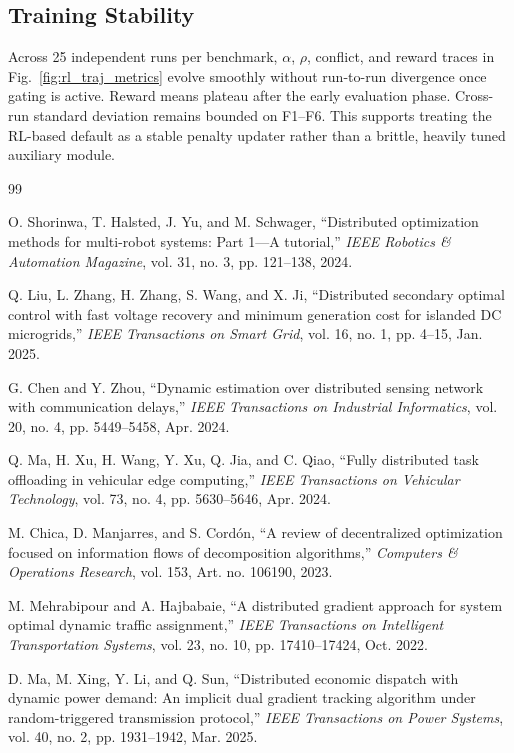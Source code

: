 \documentclass[conference]{IEEEtran}
\begin{document}
\subsection{Training Stability}\label{app:rl_stability}
Across 25 independent runs per benchmark, $\alpha$, $\rho$, conflict, and reward traces in Fig.~\ref{fig:rl_traj_metrics} evolve smoothly without run-to-run divergence once gating is active. Reward means plateau after the early evaluation phase. Cross-run standard deviation remains bounded on F1--F6. This supports treating the RL-based default as a stable penalty updater rather than a brittle, heavily tuned auxiliary module.

\begin{thebibliography}{99}

 O. Shorinwa, T. Halsted, J. Yu, and M. Schwager, ``Distributed optimization methods for multi-robot systems: Part 1---A tutorial,'' \emph{IEEE Robotics \& Automation Magazine}, vol. 31, no. 3, pp. 121--138, 2024.

 Q. Liu, L. Zhang, H. Zhang, S. Wang, and X. Ji, ``Distributed secondary optimal control with fast voltage recovery and minimum generation cost for islanded DC microgrids,'' \emph{IEEE Transactions on Smart Grid}, vol. 16, no. 1, pp. 4--15, Jan. 2025.

 G. Chen and Y. Zhou, ``Dynamic estimation over distributed sensing network with communication delays,'' \emph{IEEE Transactions on Industrial Informatics}, vol. 20, no. 4, pp. 5449--5458, Apr. 2024.

 Q. Ma, H. Xu, H. Wang, Y. Xu, Q. Jia, and C. Qiao, ``Fully distributed task offloading in vehicular edge computing,'' \emph{IEEE Transactions on Vehicular Technology}, vol. 73, no. 4, pp. 5630--5646, Apr. 2024.

 M. Chica, D. Manjarres, and S. Cord\'on, ``A review of decentralized optimization focused on information flows of decomposition algorithms,'' \emph{Computers \& Operations Research}, vol. 153, Art. no. 106190, 2023.

 M. Mehrabipour and A. Hajbabaie, ``A distributed gradient approach for system optimal dynamic traffic assignment,'' \emph{IEEE Transactions on Intelligent Transportation Systems}, vol. 23, no. 10, pp. 17410--17424, Oct. 2022.

 D. Ma, M. Xing, Y. Li, and Q. Sun, ``Distributed economic dispatch with dynamic power demand: An implicit dual gradient tracking algorithm under random-triggered transmission protocol,'' \emph{IEEE Transactions on Power Systems}, vol. 40, no. 2, pp. 1931--1942, Mar. 2025.


\end{thebibliography}
\end{document}
